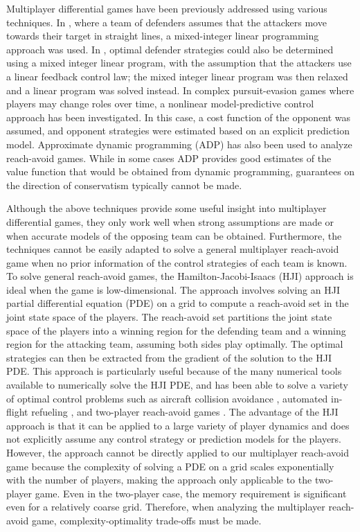 Multiplayer differential games have been previously addressed using various techniques. In \cite{Earl:2007p101}, where a team of defenders assumes that the attackers move towards their target in straight lines, a mixed-integer linear programming approach was used. In \cite{Chasparis:2005p102}, optimal defender strategies could also be determined using a mixed integer linear program, with the assumption that the attackers use a linear feedback control law; the mixed integer linear program was then relaxed and a linear program was solved instead. In complex pursuit-evasion games where players may change roles over time, a nonlinear model-predictive control \cite{Sprinkle:2004p100} approach has been investigated. In this case, a cost function of the opponent was assumed, and opponent strategies were estimated based on an explicit prediction model. Approximate dynamic programming (ADP) \cite{McGrew:2008p103} has also been used to analyze reach-avoid games. While in some cases ADP provides good estimates of the value function that would be obtained from dynamic programming, guarantees on the direction of conservatism typically cannot be made.

Although the above techniques provide some useful insight into multiplayer differential games, they only work well when strong assumptions are made or when accurate models of the opposing team can be obtained. Furthermore, the techniques cannot be easily adapted to solve a general multiplayer reach-avoid game when no prior information of the control strategies of each team is known. To solve general reach-avoid games, the Hamilton-Jacobi-Isaacs (HJI) approach \cite{b:isaacs-1967} is ideal when the game is low-dimensional. The approach involves solving an HJI partial differential equation (PDE) on a grid to compute a reach-avoid set in the joint state space of the players. The reach-avoid set partitions the joint state space of the players into a winning region for the defending team and a winning region for the attacking team, assuming both sides play optimally. The optimal strategies can then be extracted from the gradient of the solution to the HJI PDE. This approach is particularly useful because of the many numerical tools \cite{j:mitchell-TAC-2005, Sethian1996, b:osher-fedkiw-2002} available to numerically solve the HJI PDE, and has been able to solve a variety of optimal control problems such as aircraft collision avoidance \cite{j:mitchell-TAC-2005}, automated in-flight refueling \cite{DSST08}, and two-player reach-avoid games \cite{Huang2011}. The advantage of the HJI approach is that it can be applied to a large variety of player dynamics and does not explicitly assume any control strategy or prediction models for the players. However, the approach cannot be directly applied to our multiplayer reach-avoid game because the complexity of solving a PDE on a grid scales exponentially with the number of players, making the approach only applicable to the two-player game. Even in the two-player case, the memory requirement is significant even for a relatively coarse grid. Therefore, when analyzing the multiplayer reach-avoid game, complexity-optimality trade-offs must be made.

